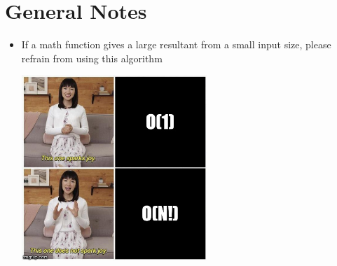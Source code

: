\documentclass{article}
\begin{document}
\newpage

\section{General Notes}

\begin{itemize}
\item If a math function gives a large resultant from a small input size, please refrain from using this algorithm

\includegraphics[width=7cm]{joy.jpg}
\end{itemize}
\end{document}
